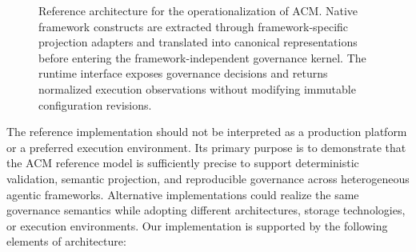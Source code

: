 \documentclass[10pt]{article}
\begin{document}
\begin{figure}[t]
\begin{tikzpicture}
\end{tikzpicture}

\caption{Reference architecture for the operationalization of ACM. Native
framework constructs are extracted through framework-specific projection
adapters and translated into canonical representations before entering the
framework-independent governance kernel. The runtime interface exposes
governance decisions and returns normalized execution observations without
modifying immutable configuration revisions.}
\label{fig:acm_reference_architecture}

\end{figure}

The reference implementation should not be interpreted as a production platform or a preferred execution environment. Its primary purpose is to demonstrate that the ACM reference model is sufficiently precise to support deterministic validation, semantic projection, and reproducible governance across heterogeneous agentic frameworks. Alternative implementations could realize the same governance semantics while adopting different architectures, storage technologies, or execution environments. Our implementation is supported by the following elements of architecture:
\end{document}

